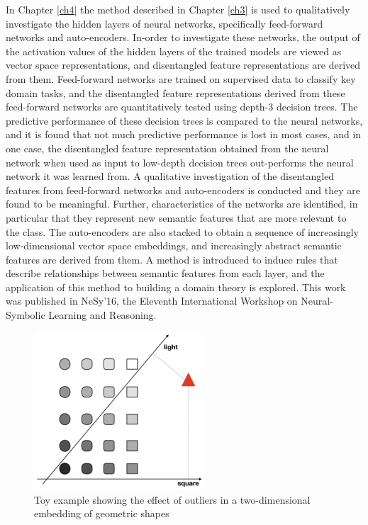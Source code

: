 In Chapter \ref{ch4} the method described in Chapter \ref{ch3} is used to qualitatively investigate the hidden layers of neural networks, specifically feed-forward networks and auto-encoders.  In-order to investigate these networks, the output of the activation values of the hidden layers  of the trained models are viewed as vector space representations,  and  disentangled feature representations are derived from them. Feed-forward networks are trained on supervised data to classify key domain tasks, and the disentangled feature representations derived from these feed-forward networks are quantitatively tested using depth-3 decision trees. The predictive performance of these decision trees is compared to the neural networks, and it is found that not much predictive performance is lost in most cases, and in one case, the disentangled feature representation obtained from the neural network when used as input to low-depth decision trees  out-performs the neural network it was learned from. A qualitative investigation of the disentangled features from feed-forward networks and auto-encoders is conducted and they are found to be meaningful. Further, characteristics of the networks are identified, in particular that they represent new semantic features that are more relevant to the class. The auto-encoders are also stacked to obtain a sequence of increasingly low-dimensional vector space embeddings, and increasingly abstract semantic features are derived from them. A method is introduced to induce rules that describe relationships between semantic features from each layer, and the application of this method to  building a domain theory is explored. This work was published in NeSy'16, the Eleventh International Workshop on Neural-Symbolic Learning and Reasoning.


\begin{figure}
	\centering
	\includegraphics[width=180pt]{images/shapes}
	\caption{Toy example showing the effect of outliers in a two-dimensional embedding of geometric shapes}
	\label{ch1:toyExample}
\end{figure}


